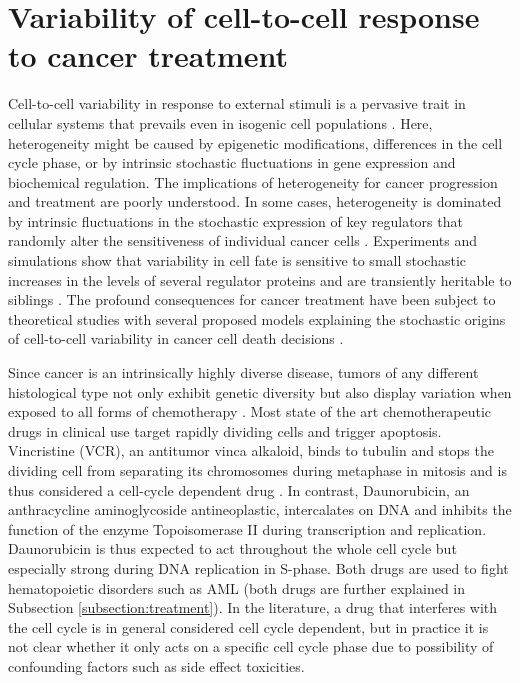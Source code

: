 \documentclass[pdftex,12pt,a4paper]{report}
\begin{document}
\section{Variability of cell-to-cell response to cancer treatment}

Cell-to-cell variability in response to external stimuli is a pervasive trait in cellular systems that prevails even in isogenic cell populations \cite{snijder2011origins}. Here, heterogeneity might be caused by epigenetic modifications, differences in the cell cycle phase, or by intrinsic stochastic fluctuations in gene expression and biochemical regulation. The implications of heterogeneity for cancer progression and treatment are poorly understood. In some cases, heterogeneity is dominated by intrinsic fluctuations in the stochastic expression of key regulators that randomly alter the sensitiveness of individual cancer cells \cite{spencer2009non}. Experiments and simulations show that variability in cell fate is sensitive to small stochastic increases in the levels of several regulator proteins and are transiently heritable to siblings \cite{bertaux2014modeling, gaudet2012exploring}. The profound consequences for cancer treatment have been subject to theoretical studies with several proposed models explaining the stochastic origins of cell-to-cell variability in cancer cell death decisions \cite{bhola2009determinism, greene2015modeling}.

Since cancer is an intrinsically highly diverse disease, tumors of any different histological type not only exhibit genetic diversity but also display variation when exposed to all forms of chemotherapy \cite{beroukhim2010landscape}. Most state of the art chemotherapeutic drugs in clinical use target rapidly dividing cells and trigger apoptosis. Vincristine (VCR), an antitumor vinca alkaloid, binds to tubulin and stops the dividing cell from separating its chromosomes during metaphase in mitosis and is thus considered a cell-cycle dependent drug \cite{sears2015total}. In contrast, Daunorubicin, an anthracycline aminoglycoside antineoplastic, intercalates on DNA and inhibits the function of the enzyme Topoisomerase II during transcription and replication. Daunorubicin is thus expected to act throughout the whole cell cycle but especially strong during DNA replication in S-phase. Both drugs are used to fight hematopoietic disorders such as AML (both drugs are further explained in Subsection \ref{subsection:treatment}). In the literature, a drug that interferes with the cell cycle is in general considered cell cycle dependent, but in practice it is not clear whether it only acts on a specific cell cycle phase due to possibility of confounding factors such as side effect toxicities.
\end{document}
